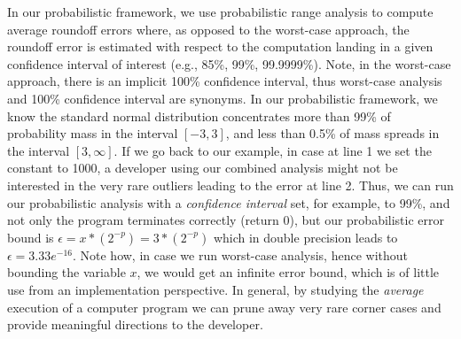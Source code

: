 In our probabilistic framework, we use probabilistic range analysis to compute average roundoff errors where, as opposed to the worst-case approach, the roundoff error is estimated with respect to the computation landing in a given confidence interval of interest (e.g., 85\%, 99\%, 99.9999\%).
%
Note, in the worst-case approach, there is an implicit 100\% confidence interval, thus worst-case analysis and 100\% confidence interval are synonyms.
%
In our probabilistic framework, we know the standard normal distribution concentrates more than 99\% of probability mass in the interval $[−3, 3]$, and less than 0.5\% of mass spreads in the interval $[3, \infty]$.
%
If we go back to our example, in case at line 1 we set the constant to 1000, a developer using our combined analysis might not be interested in the very rare outliers leading to the error at line 2.
%
Thus, we can run our probabilistic analysis with a \emph{confidence interval} set, for example, to 99\%, and not only the program terminates correctly (return 0), but our probabilistic error bound is $\epsilon = x*(2^{-p}) = 3*(2^{-p})$ which in double precision leads to $\epsilon = 3.33e^{-16}$.
%
Note how, in case we run worst-case analysis, hence without bounding the variable $x$, we would get an infinite error bound, which is of little use from an implementation perspective. 
%
In general, by studying the \emph{average} execution of a computer program we can prune away very rare corner cases and provide meaningful directions to the developer.
%
\newpage



%
%
%

%
%
